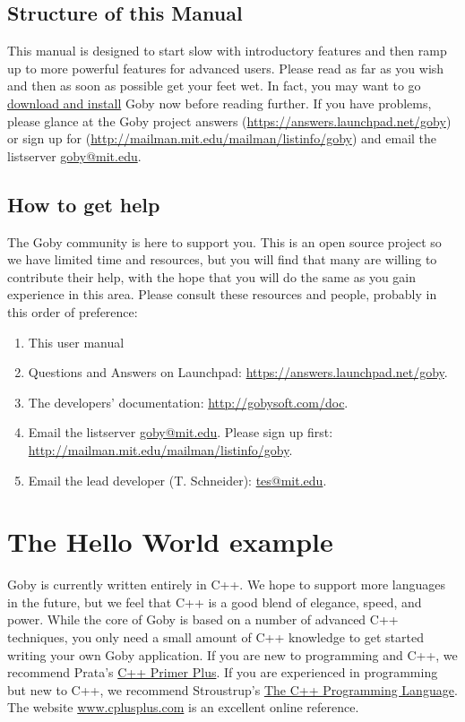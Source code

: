 \documentclass[11pt, letterpaper]{article}
\begin{document}
\subsection{Structure of this Manual}
This manual is designed to start slow with introductory features and then ramp up to more powerful features for advanced users. Please read as far as you wish and then as soon as possible get your feet wet. In fact, you may want to go \href{http://gobysoft.com/doc}{download and install} Goby now before reading further. If you have problems, please glance at the Goby project answers (\url{https://answers.launchpad.net/goby}) or sign up for (\url{http://mailman.mit.edu/mailman/listinfo/goby}) and email the listserver \href{mailto:goby@mit.edu}{goby@mit.edu}.

\subsection{How to get help}
The Goby community is here to support you. This is an open source project so we have limited time and resources, but you will find that many are willing to contribute their help, with the hope that you will do the same as you gain experience in this area. Please consult these resources and people, probably in this order of preference:

\begin{enumerate}
\item This user manual %
\item Questions and Answers on Launchpad: \url{https://answers.launchpad.net/goby}.
\item The developers' documentation: \url{http://gobysoft.com/doc}.
\item Email the listserver \href{mailto:goby@mit.edu}{goby@mit.edu}. Please sign up first: \url{http://mailman.mit.edu/mailman/listinfo/goby}.
\item Email the lead developer (T. Schneider): \href{mailto:tes@mit.edu}{tes@mit.edu}.
\end{enumerate}

\section{The Hello World example}

Goby is currently written entirely in C++. We hope to support more languages in the future, but we feel that C++ is a good blend of elegance, speed, and power. While the core of Goby is based on a number of advanced C++ techniques, you only need a small amount of C++ knowledge to get started writing your own Goby application. If you are new to programming and C++, we recommend Prata's \href{http://www.amazon.com/Primer-Plus-5th-Stephen-Prata/dp/0672326973}{C++ Primer Plus}. If you are experienced in programming but new to C++, we recommend Stroustrup's \href{http://www.amazon.com/C-Programming-Language-Special/dp/0201700735}{The C++ Programming Language}. The website \url{www.cplusplus.com} is an excellent online reference.
\end{document}
